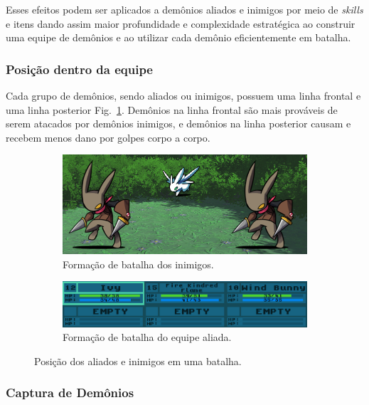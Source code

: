 \documentclass[
	12pt,				%
	openright,			%
	twoside,			%
	a4paper,			%
	english,			%
	french,				%
	spanish,			%
	brazil				%
	]{abntex2}
\begin{document}
Esses efeitos podem ser aplicados a demônios aliados e inimigos por meio de \emph{skills} e itens dando assim maior profundidade e complexidade estratégica ao construir uma equipe de demônios e ao utilizar cada demônio eficientemente em batalha. 


\subsubsection{Posição dentro da equipe}\label{info:position}

Cada grupo de demônios, sendo aliados ou inimigos, possuem uma linha frontal e uma linha posterior Fig.~\ref{fig:battle3}. Demônios na linha frontal são mais prováveis  de serem atacados por demônios inimigos, e demônios na linha posterior causam e recebem menos dano por golpes corpo a corpo.

\begin{figure}[h!]
  \centering
  \begin{subfigure}[b]{0.5\linewidth}
    \includegraphics[width=\linewidth]{enemyformation.jpg}
     \caption{Formação de batalha dos inimigos.}
  \end{subfigure}
  \begin{subfigure}[b]{0.5\linewidth}
    \includegraphics[width=\linewidth]{partyformation.jpg}
    \caption{Formação de batalha do equipe aliada.}
  \end{subfigure}
  \caption{Posição dos aliados e inimigos em uma batalha.}
  \label{fig:battle3}
\end{figure}

\subsubsection{Captura de Demônios}
\end{document}
